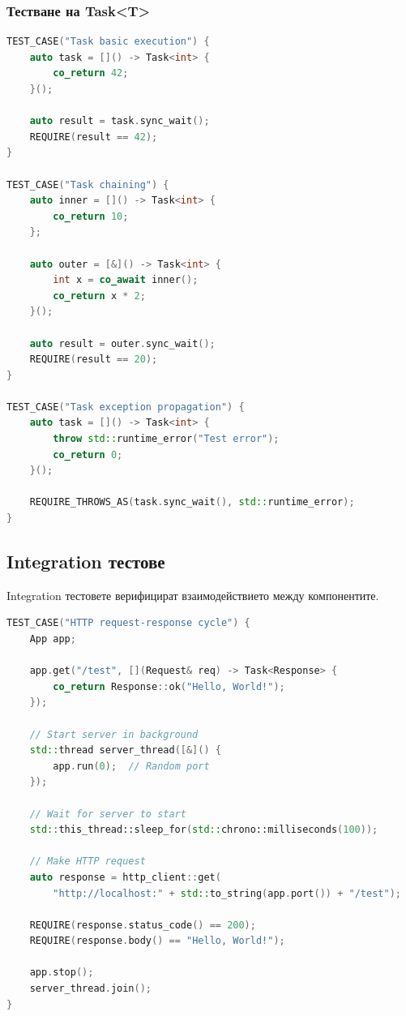 \subsubsection{Тестване на Task<T>}

\begin{lstlisting}[language=C++, basicstyle=\small\ttfamily, caption={Task coroutine tests}]
TEST_CASE("Task basic execution") {
    auto task = []() -> Task<int> {
        co_return 42;
    }();
    
    auto result = task.sync_wait();
    REQUIRE(result == 42);
}

TEST_CASE("Task chaining") {
    auto inner = []() -> Task<int> {
        co_return 10;
    };
    
    auto outer = [&]() -> Task<int> {
        int x = co_await inner();
        co_return x * 2;
    }();
    
    auto result = outer.sync_wait();
    REQUIRE(result == 20);
}

TEST_CASE("Task exception propagation") {
    auto task = []() -> Task<int> {
        throw std::runtime_error("Test error");
        co_return 0;
    }();
    
    REQUIRE_THROWS_AS(task.sync_wait(), std::runtime_error);
}
\end{lstlisting}

\subsection{Integration тестове}

Integration тестовете верифицират взаимодействието между компонентите.

\begin{lstlisting}[language=C++, basicstyle=\small\ttfamily, caption={HTTP integration test}]
TEST_CASE("HTTP request-response cycle") {
    App app;
    
    app.get("/test", [](Request& req) -> Task<Response> {
        co_return Response::ok("Hello, World!");
    });
    
    // Start server in background
    std::thread server_thread([&]() {
        app.run(0);  // Random port
    });
    
    // Wait for server to start
    std::this_thread::sleep_for(std::chrono::milliseconds(100));
    
    // Make HTTP request
    auto response = http_client::get(
        "http://localhost:" + std::to_string(app.port()) + "/test");
    
    REQUIRE(response.status_code() == 200);
    REQUIRE(response.body() == "Hello, World!");
    
    app.stop();
    server_thread.join();
}
\end{lstlisting}


